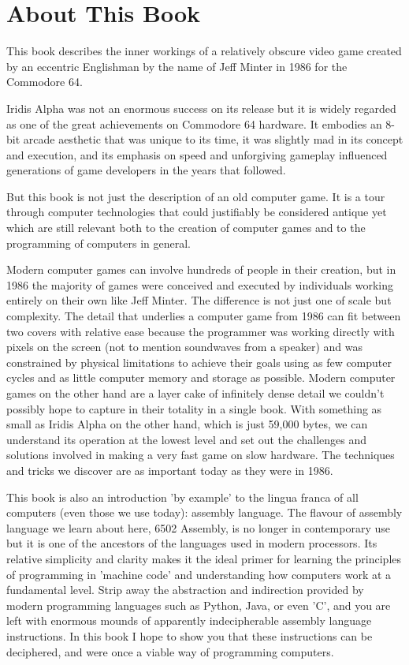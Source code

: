 \chapter*{About This Book} 
This book describes the inner workings of a relatively obscure video game created
by an eccentric Englishman by the name of Jeff Minter in 1986 for the Commodore 64.

Iridis Alpha was not an enormous success on its release but it is widely regarded as
one of the great achievements on Commodore 64 hardware. It embodies an
8-bit arcade aesthetic that was unique to its time, it was slightly mad in its
concept and execution, and its emphasis on speed and unforgiving gameplay
influenced generations of game developers in the years that followed.

But this book is not just the description of an old computer game. 
It is a tour through computer technologies that could justifiably be considered
antique yet which are still relevant both to the creation of 
computer games and to the programming of computers in general.

Modern computer games can involve hundreds of people in their creation, but in 
1986 the majority of games were conceived and executed by individuals working
entirely on their own like Jeff Minter. The difference is not just one of scale but complexity.
The detail that underlies a computer game from 1986 can fit between two covers
with relative ease because the programmer was working directly with pixels on the
screen (not to mention soundwaves from a speaker) and was constrained by physical
limitations to achieve their goals using as few computer cycles and as little
computer memory and storage as possible. Modern computer games on the other hand are a layer cake
of infinitely dense detail we couldn't possibly hope to capture in their totality
in a single book. With something as small as Iridis Alpha on the other hand,
which is just 59,000 bytes, we can 
understand its operation at the lowest level and set out the challenges and
solutions involved in making a very fast game on slow hardware. The techniques and
tricks we discover are as important today as they were in 1986.

This book is also an introduction 'by example' to the lingua franca of all computers
(even those we use today): assembly language. The flavour of assembly language we learn about here,
6502 Assembly, is no longer in contemporary use but it is one of the
ancestors of the languages used in modern processors. Its relative 
simplicity and clarity makes it the ideal primer for learning the principles
of programming in 'machine code' and understanding how computers work at a fundamental
level. Strip away the abstraction and indirection provided by modern programming
languages such as Python, Java, or even 'C', and you are left with enormous mounds
of apparently indecipherable assembly language instructions. In this book I hope
to show you that these instructions can be deciphered, and were once a viable
way of programming computers.

